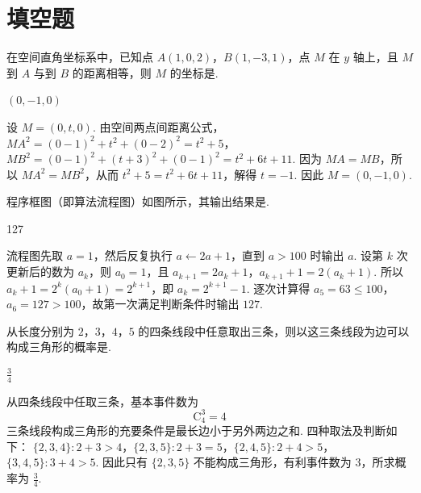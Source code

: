 \section{填空题}

\begin{problem}
在空间直角坐标系中，已知点 \(A(1,0,2)\)，\(B(1,-3,1)\)，点 \(M\) 在 \(y\) 轴上，且 \(M\) 到 \(A\) 与到 \(B\) 的距离相等，则 \(M\) 的坐标是\fillinblank{}.
\end{problem}

\begin{answer}
\((0,-1,0)\)
\end{answer}

\begin{solution}
设 \(M=(0,t,0)\). 由空间两点间距离公式，
\(MA^2=(0-1)^2+t^2+(0-2)^2=t^2+5\)，\(MB^2=(0-1)^2+(t+3)^2+(0-1)^2=t^2+6t+11\).
因为 \(MA=MB\)，所以 \(MA^2=MB^2\)，从而 \(t^2+5=t^2+6t+11\)，解得 \(t=-1\). 因此 \(M=(0,-1,0)\).
\end{solution}

\begin{problem}
程序框图（即算法流程图）如图所示，其输出结果是\fillinblank{}.

\end{problem}

\begin{answer}
127
\end{answer}

\begin{solution}
流程图先取 \(a=1\)，然后反复执行 \(a\leftarrow2a+1\)，直到 \(a>100\) 时输出 \(a\). 设第 \(k\) 次更新后的数为 \(a_k\)，则 \(a_0=1\)，且
\(a_{k+1}=2a_k+1\)，\(a_{k+1}+1=2(a_k+1)\).
所以 \(a_k+1=2^k(a_0+1)=2^{k+1}\)，即 \(a_k=2^{k+1}-1\). 逐次计算得 \(a_5=63\leqslant100\)，\(a_6=127>100\)，故第一次满足判断条件时输出 \(127\).
\end{solution}

\begin{problem}
从长度分别为 \(2\)，\(3\)，\(4\)，\(5\) 的四条线段中任意取出三条，则以这三条线段为边可以构成三角形的概率是\fillinblank{}.
\end{problem}

\begin{answer}
\(\frac{3}{4}\)
\end{answer}

\begin{solution}
从四条线段中任取三条，基本事件数为
\[
\mathrm C_4^3=4
\]
三条线段构成三角形的充要条件是最长边小于另外两边之和. 四种取法及判断如下：
\(\{2,3,4\}:2+3>4\)，\(\{2,3,5\}:2+3=5\)，\(\{2,4,5\}:2+4>5\)，\(\{3,4,5\}:3+4>5\).
因此只有 \(\{2,3,5\}\) 不能构成三角形，有利事件数为 \(3\)，所求概率为 \(\frac{3}{4}\).
\end{solution}

